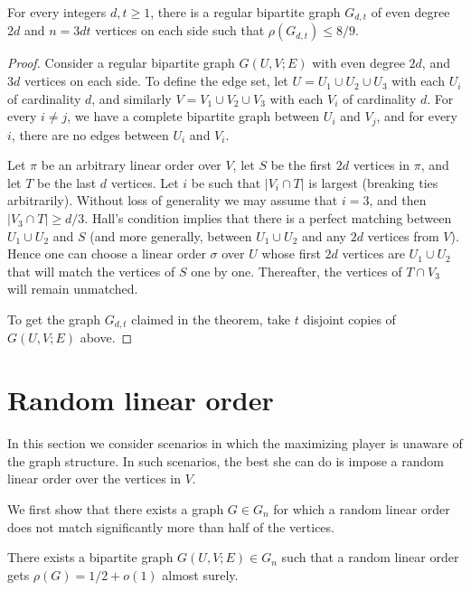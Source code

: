 \begin{theorem}\label{thm:reg_89}
	For every integers $d, t \ge 1$, there is a regular bipartite graph $G_{d,t}$ of even degree $2d$ and $n= 3dt$ vertices on each side such that $\rho(G_{d,t}) \le 8/9$.
\end{theorem}

\begin{proof}
	Consider a regular bipartite graph $G(U,V;E)$ with even degree $2d$, and $3d$ vertices on each side. To define the edge set, let $U = U_1 \cup U_2 \cup U_3$ with each $U_i$ of cardinality $d$, and similarly $V = V_1 \cup V_2 \cup V_3$ with each $V_i$ of cardinality $d$. For every $i \not= j$, we have a complete bipartite graph between $U_i$ and $V_j$, and for every $i$, there are no edges between $U_i$ and $V_i$.
	
	Let $\pi$ be an arbitrary linear order over $V$, let $S$ be the first $2d$ vertices in $\pi$, and let $T$ be the last $d$ vertices. Let $i$ be such that $|V_i \cap T|$ is largest (breaking ties arbitrarily). Without loss of generality we may assume that $i = 3$, and then $|V_3 \cap T| \ge d/3$. Hall's condition implies that there is a perfect matching between $U_1 \cup U_2$ and $S$ (and more generally, between $U_1 \cup U_2$ and any $2d$ vertices from $V$). Hence one can choose a linear order $\sigma$ over $U$ whose first $2d$ vertices are $U_1 \cup U_2$ that will match the vertices of $S$ one by one. Thereafter, the vertices of $T \cap V_3$ will remain unmatched.
	
	To get the graph $G_{d,t}$ claimed in the theorem, take $t$ disjoint copies of $G(U,V;E)$ above.
\end{proof}






\section{Random linear order}
\label{sec:random}

In this section we consider scenarios in which the maximizing player is unaware of the graph structure.
In such scenarios, the best she can do is impose a random linear order over the vertices in $V$.

We first show that there exists a graph $G \in G_n$ for which a random linear order does not match significantly more than %
half of the vertices.%

\begin{proposition}
	There exists a bipartite graph $G(U,V;E) \in G_n$ such that a random linear order gets $\rho(G)=1/2+o(1)$ almost surely.
	\label{ex:half}
\end{proposition}


